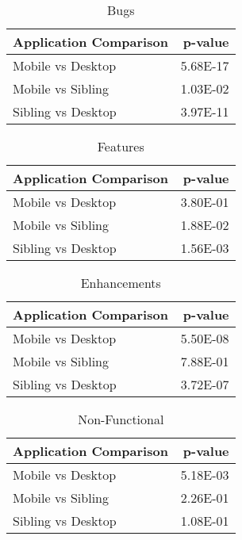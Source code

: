 \begin{table}[ht]
\centering
\caption{Bugs} 
\begin{tabular}{lr}
  \hline
Application Comparison & p-value \\ 
  \hline
Mobile vs Desktop & 5.68E-17 \\ 
  Mobile vs Sibling & 1.03E-02 \\ 
  Sibling vs Desktop & 3.97E-11 \\ 
   \hline
\end{tabular}
\end{table}
\begin{table}[ht]
\centering
\caption{Features} 
\begin{tabular}{lr}
  \hline
Application Comparison & p-value \\ 
  \hline
Mobile vs Desktop & 3.80E-01 \\ 
  Mobile vs Sibling & 1.88E-02 \\ 
  Sibling vs Desktop & 1.56E-03 \\ 
   \hline
\end{tabular}
\end{table}
\begin{table}[ht]
\centering
\caption{Enhancements} 
\begin{tabular}{lr}
  \hline
Application Comparison & p-value \\ 
  \hline
Mobile vs Desktop & 5.50E-08 \\ 
  Mobile vs Sibling & 7.88E-01 \\ 
  Sibling vs Desktop & 3.72E-07 \\ 
   \hline
\end{tabular}
\end{table}
\begin{table}[ht]
\centering
\caption{Non-Functional} 
\begin{tabular}{lr}
  \hline
Application Comparison & p-value \\ 
  \hline
Mobile vs Desktop & 5.18E-03 \\ 
  Mobile vs Sibling & 2.26E-01 \\ 
  Sibling vs Desktop & 1.08E-01 \\ 
   \hline
\end{tabular}
\end{table}
